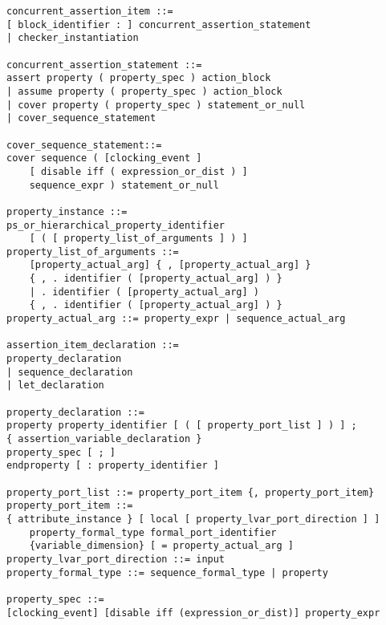 \documentclass[conference]{IEEEtran}
\begin{document}
	

\let\thefootnote\relax{}
\begin{lstlisting}
concurrent_assertion_item ::=
[ block_identifier : ] concurrent_assertion_statement
| checker_instantiation

concurrent_assertion_statement ::=
assert property ( property_spec ) action_block
| assume property ( property_spec ) action_block
| cover property ( property_spec ) statement_or_null
| cover_sequence_statement

cover_sequence_statement::=
cover sequence ( [clocking_event ] 
	[ disable iff ( expression_or_dist ) ]
	sequence_expr ) statement_or_null
	
property_instance ::=
ps_or_hierarchical_property_identifier 
	[ ( [ property_list_of_arguments ] ) ]
property_list_of_arguments ::=
	[property_actual_arg] { , [property_actual_arg] } 
	{ , . identifier ( [property_actual_arg] ) }
	| . identifier ( [property_actual_arg] ) 
	{ , . identifier ( [property_actual_arg] ) }
property_actual_arg ::= property_expr | sequence_actual_arg

assertion_item_declaration ::= 
property_declaration
| sequence_declaration 
| let_declaration
	
property_declaration ::= 
property property_identifier [ ( [ property_port_list ] ) ] ;
{ assertion_variable_declaration }
property_spec [ ; ]
endproperty [ : property_identifier ]

property_port_list ::= property_port_item {, property_port_item}
property_port_item ::=
{ attribute_instance } [ local [ property_lvar_port_direction ] ]
	property_formal_type formal_port_identifier 
	{variable_dimension} [ = property_actual_arg ]
property_lvar_port_direction ::= input
property_formal_type ::= sequence_formal_type | property 

property_spec ::=
[clocking_event] [disable iff (expression_or_dist)] property_expr


\end{lstlisting}
\end{document}

